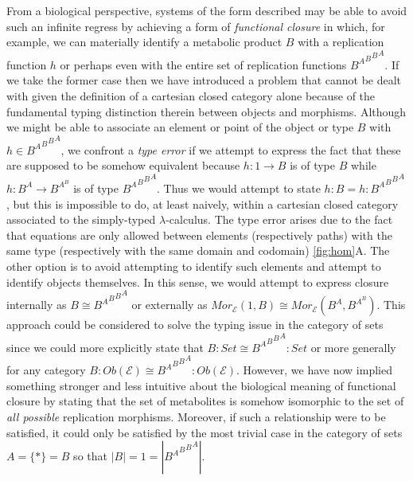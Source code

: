 \documentclass[10pt]{article}
\theoremstyle{plain}
\theoremstyle{definition}
\theoremstyle{remark}
\begin{document}
From a biological perspective, systems of the form described may be able to avoid such an infinite regress by achieving a form of \emph{functional closure} in which, for example, we can materially identify a metabolic product $B$ with a replication function $h$ or perhaps even with the entire set of replication functions ${{{{B^A}^B}^B}^A}$. If we take the former case then we have introduced a problem that cannot be dealt with given the definition of a cartesian closed category alone because of the fundamental typing distinction therein between objects and morphisms. Although we might be able to associate an element or point of the object or type $B$ with $h \in {{{{B^A}^B}^B}^A}$, we confront a \emph{type error} if we attempt to express the fact that these are supposed to be somehow equivalent because $h \colon 1 \rightarrow B$ is of type $B$ while $h \colon B^A \rightarrow B^{A^B}$ is of type ${{{{B^A}^B}^B}^A}$. Thus we would attempt to state $h:B = h:{{{{B^A}^B}^B}^A}$, but this is impossible to do, at least naively, within a cartesian closed category associated to the simply-typed $\lambda$-calculus.  The type error arises due to the fact that equations are only allowed between elements (respectively paths) with the same type (respectively with the same domain and codomain) \ref{fig:hom}A. The other option is to avoid attempting to identify such elements and attempt to identify objects themselves. In this sense, we would attempt to express closure internally as $B \cong {{{{B^A}^B}^B}^A}$ or externally as $Mor_{\mathcal{E}}(1,B) \cong Mor_{\mathcal{E}}(B^A,B^{A^B})$. This approach could be considered to solve the typing issue in the category of sets since we could more explicitly state that $B \colon Set \cong {{{{B^A}^B}^B}^A} \colon Set$ or more generally for any category $B \colon Ob(\mathcal{E}) \cong {{{{B^A}^B}^B}^A} \colon Ob(\mathcal{E})$. However, we have now implied something stronger and less intuitive about the biological meaning of functional closure by stating that the set of metabolites is somehow isomorphic to the set of \emph{all possible} replication morphisms. Moreover, if such a relationship were to be satisfied, it could only be satisfied by the most trivial case in the category of sets $A = \{*\} = B$ so that $|B|=1=|{{{{B^A}^B}^B}^A}|$.
\end{document}
